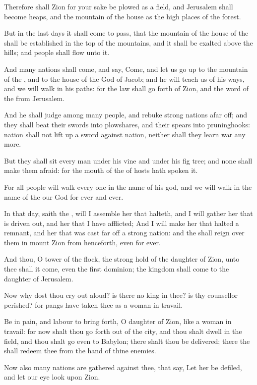 \Verse Therefore shall Zion for your sake be plowed as a field, and Jerusalem shall become heaps, and the mountain of the house as the high places of the forest.


\Chapter
\Verse But in the last days it shall come to pass, that the mountain of the house of the \LORD shall be established in the top of the mountains, and it shall be exalted above the hills; and people shall flow unto it.

\Verse And many nations shall come, and say, Come, and let us go up to the mountain of the \LORD, and to the house of the God of Jacob; and he will teach us of his ways, and we will walk in his paths: for the law shall go forth of Zion, and the word of the \LORD from Jerusalem.

\Verse And he shall judge among many people, and rebuke strong nations afar off; and they shall beat their swords into plowshares, and their spears into pruninghooks: nation shall not lift up a sword against nation, neither shall they learn war any more.

\Verse But they shall sit every man under his vine and under his fig tree; and none shall make them afraid: for the mouth of the \LORD of hosts hath spoken it.

\Verse For all people will walk every one in the name of his god, and we will walk in the name of the \LORD our God for ever and ever.

\Verse In that day, saith the \LORD, will I assemble her that halteth, and I will gather her that is driven out, and her that I have afflicted; \Verse And I will make her that halted a remnant, and her that was cast far off a strong nation: and the \LORD shall reign over them in mount Zion from henceforth, even for ever.

\Verse And thou, O tower of the flock, the strong hold of the daughter of Zion, unto thee shall it come, even the first dominion; the kingdom shall come to the daughter of Jerusalem.

\Verse Now why dost thou cry out aloud? is there no king in thee? is thy counsellor perished? for pangs have taken thee as a woman in travail.

\Verse Be in pain, and labour to bring forth, O daughter of Zion, like a woman in travail: for now shalt thou go forth out of the city, and thou shalt dwell in the field, and thou shalt go even to Babylon; there shalt thou be delivered; there the \LORD shall redeem thee from the hand of thine enemies.

\Verse Now also many nations are gathered against thee, that say, Let her be defiled, and let our eye look upon Zion.

